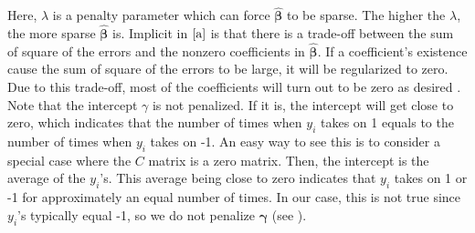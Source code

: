 \documentclass{article}
\begin{document}
Here, $\lambda$ is a penalty parameter which can force $\hat{\boldsymbol{\beta}}$ to be sparse. The higher the $\lambda$, the more sparse $\hat{\boldsymbol{\beta}}$ is. Implicit in $\eqref{a}$ is that there is a trade-off between the sum of square of the errors and the nonzero coefficients in $\hat{\boldsymbol{\beta}}$. If a coefficient's existence cause the sum of square of the errors to be large, it will be regularized to zero. Due to this trade-off, most of the coefficients will turn out to be zero as desired \cite{applied}. Note that the intercept $\gamma$ is not penalized. If it is, the intercept will get close to zero, which indicates that the number of times when $y_i$ takes on 1 equals to the number of times when $y_i$ takes on -1. An easy way to see this is to consider a special case where the $C$ matrix is a zero matrix. Then, the intercept is the average of the $y_i$'s. This average being close to zero indicates that $y_i$ takes on 1 or -1 for approximately an equal number of times. In our case, this is not true since $y_i$'s typically equal -1, so we do not penalize $\boldsymbol{\gamma}$ (see \cite{elghaoui_1}).
\end{document}

